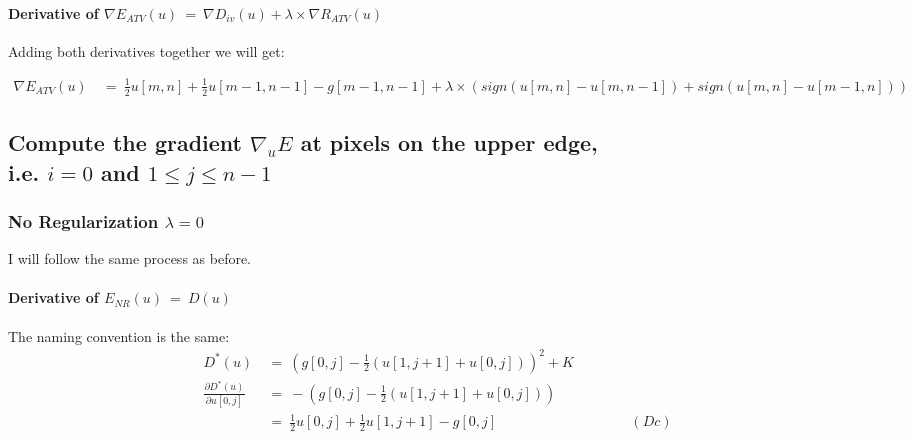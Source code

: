 \documentclass{report}
\begin{document}
\begin{enumerate}[(i)]
						\vspace{-0.6cm} \paragraph{Derivative of $\nabla E_{ATV}(u) \ = \ \nabla D_{iv}(u) + \lambda \times \nabla R_{ATV}(u)$}
						\startsubsection
							Adding both derivatives together we will get:
						\closesection
						\begin{adjustwidth}{-12em}{}
							\vspace{-0.6cm}
							\begin{align*}
								\nabla E_{ATV}(u) \ & = \ \frac{1}{2} u[m,n]  + \frac{1}{2} u[m-1,n-1] - g[m-1,n-1] + \lambda \times (sign(u[m,n] - u[m,n-1]) + sign(u[m,n] - u[m-1,n]))
							\end{align*}
						\end{adjustwidth}
					\end{enumerate}
				\closesection
			\closesection
		\closesection
		
		\subsection{Compute the gradient $\nabla_u E$ at pixels on the upper edge, \\ i.e. $i = 0$ and $1 \leq j \leq n-1$}
		\startsubsection
			\subsubsection{No Regularization $\lambda = 0$}
			\startsubsection
				I will follow the same process as before.
				\vspace{-0.4cm} \paragraph{Derivative of  $E_{NR}(u) \ = \ D(u)$}
				\startsubsection
					The naming convention is the same:
					\vspace{-0.2cm}
					\begin{align*}
						D^*(u) \ & = \ (g[0,j] - \frac{1}{2} (u[1,j+1] + u[0,j]))^2 + K \\
						\frac{\partial D^*(u)}{\partial u[0,j]} \ & = \ - (g[0,j] - \frac{1}{2} (u[1,j+1] + u[0,j])) \\
						& = \ \frac{1}{2} u[0,j]  + \frac{1}{2} u[1,j+1] - g[0,j] \hspace{4cm} (Dc)
					\end{align*}
				\closesection
			\closesection
\end{document}
